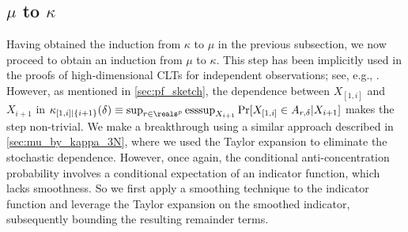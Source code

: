 \documentclass[aos]{imsart}
\begin{document}
\subsection{\texorpdfstring{$\mu$}{μ} to \texorpdfstring{$\kappa$}{κ}}
\label{sec:kappa_by_mu_N}
Having obtained the induction from $\kappa$ to $\mu$ in the previous subsection, we now proceed to obtain an induction from $\mu$ to $\kappa$. This step has been  implicitly used in the proofs of high-dimensional CLTs for independent observations; see, e.g., . However, as mentioned in \cref{sec:pf_sketch}, %
the dependence between $X_{[1,i]}$ and $X_{i+1}$ in $\kappa_{[1,i]|\{i+1\}}(\delta) \equiv \sup_{r\in\reals^p} {\mathrm{esssup}}_{X_{i+1}} \Pr[{X}_{[1,i]} \in A_{r,\delta} | X_{i+1}]$ makes the step non-trivial. We make a breakthrough using a similar approach described in \cref{sec:mu_by_kappa_3N}, where we used the Taylor expansion to eliminate the stochastic dependence. However, once again, the conditional anti-concentration probability involves a conditional expectation of an indicator function, which lacks smoothness. So we first apply a smoothing technique to the indicator function and leverage the Taylor expansion on the smoothed indicator, subsequently bounding the resulting remainder terms.
\end{document}
